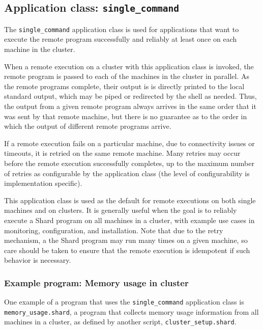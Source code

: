 \documentclass[oneside]{report}
\begin{document}
\subsection{Application class: \texttt{single\_command}}

The \texttt{single\_command} application class is used for applications that want to execute the remote program successfully and reliably at least once on each machine in the cluster.

When a remote execution on a cluster with this application class is invoked, the remote program is passed to each of the machines in the cluster in parallel.
As the remote programs complete, their output is is directly printed to the local standard output, which may be piped or redirected by the shell as needed.
Thus, the output from a given remote program always arrives in the same order that it was sent by that remote machine, but there is no guarantee as to the order in which the output of different remote programs arrive.

If a remote execution fails on a particular machine, due to connectivity issues or timeouts, it is retried on the same remote machine.
Many retries may occur before the remote execution successfully completes, up to the maximum number of retries as configurable by the application class (the level of configurability is implementation specific).

This application class is used as the default for remote executions on both single machines and on clusters.
It is generally useful when the goal is to reliably execute a Shard program on all machines in a cluster, with example use cases in monitoring, configuration, and installation.
Note that due to the retry mechanism, a the Shard program may run many times on a given machine, so care should be taken to ensure that the remote execution is idempotent if such behavior is necessary.

\subsubsection{Example program: Memory usage in cluster}

\begin{sloppypar}
  One example of a program that uses the \texttt{single\_command} application class is \texttt{memory\_usage.shard}, a program that collects memory usage information from all machines in a cluster, as defined by another script, \texttt{cluster\_setup.shard}.
\end{sloppypar}
\end{document}
